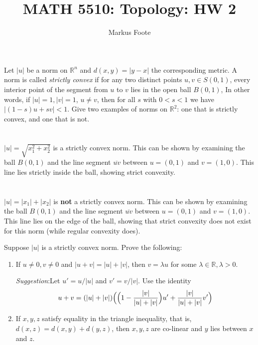 \documentclass{jhwhw}
\title{MATH 5510: Topology: HW 2}
\author{Markus Foote}
\begin{document}
\problem{}%
 Let $|u|$ be a norm on $\mathbb{R}^n$ and $d(x,y) = |y - x|$ the corresponding metric. A norm is called \emph{strictly convex} if for any two distinct points $u,v\in S(0,1)$, every interior point of the segment from $u$ to $v$ lies in the open ball $B(0,1)$,  In other words, if $|u|=1, |v| = 1$, $u\ne v$, then for all $s$ with $0<s<1$ we have $|(1-s) u + s v |   <1$.  Give two examples of norms on $\mathbb{R}^2$: one that is strictly convex, and one that is not.

\solution{}
\part{}
$|u| = \sqrt{x_1^2+x_2^2}$ is a strictly convex norm. This can be shown by examining the ball $B(0,1)$ and the line segment $\overline{uv}$ between $u=(0,1)$ and $v=(1,0)$. This line lies strictly inside the ball, showing strict convexity.
\begin{center}
\end{center}

\part{}
$|u| = |x_1|+|x_2|$ is \textbf{not} a strictly convex norm. This can be shown by examining the ball $B(0,1)$ and the line segment $\overline{uv}$ between $u=(0,1)$ and $v=(1,0)$. This line lies on the edge of the ball, showing that strict convexity does not exist for this norm (while regular convexity does).
\begin{center}
\end{center}


\problem{} %
Suppose $|u|$ is a strictly convex norm. Prove the following:
\begin{enumerate}
	\item If $u\ne 0, v\ne 0$ and $|u + v| = |u| + |v|$, then $v = \lambda u$ for some $\lambda \in \mathbb{R}, \lambda >0$.
	
	\emph{Suggestion}:Let $ u' = u/|u|$ and $v' = v/|v|$. Use the identity
	$$
	u + v = (|u| + |v|) \Big{(} \Big{(}1 - \frac{|v|}{|u| + |v|}\Big{) }u' + \frac{|v|}{|u|+ |v|} v' \Big{)}
	$$
	
	\item If $x,y,z$ satisfy equality in the triangle inequality, that is, $d(x,z) = d(x,y) + d(y,z)$, then $x,y,z$ are co-linear and $y$ lies between $x$ and $z$.
\end{enumerate}
\end{document}
